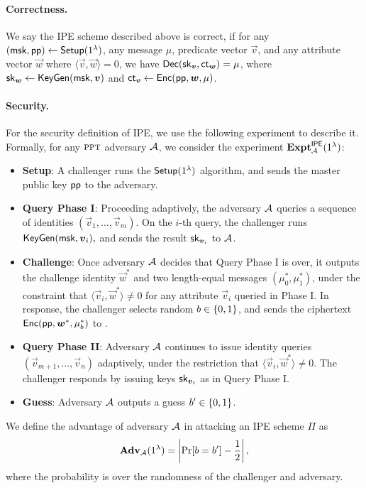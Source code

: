 \paragraph{Correctness.} We say the IPE scheme described above is correct, if for any $(\mathsf{msk}, \mathsf{pp}) \leftarrow \mathsf{Setup}(1^\lambda)$, any message $\mu$, predicate vector $\vec{v}$, and any attribute vector $\vec{w}$ where $\langle \vec{v}, \vec{w}\rangle = 0$, we have $\mathsf{Dec}(\mathsf{sk}_{\boldsymbol{v}}, \mathsf{ct}_{\boldsymbol{w}}) = \mu$, where $\mathsf{sk}_{\boldsymbol{w}} \leftarrow \mathsf{KeyGen}(\mathsf{msk}, \boldsymbol{v})$ and $\mathsf{ct}_{\boldsymbol{v}} \leftarrow \mathsf{Enc}(\mathsf{pp}, \boldsymbol{w}, \mu)$.

\paragraph{Security.}For the security definition of IPE, we use the following experiment to describe it. Formally, for any $\textsc{ppt}$ adversary $\mathcal{A}$, we consider the experiment $\mathbf{Expt}_{\mathcal{A}}^{\mathsf{IPE}}(1^\lambda)$:
\begin{itemize}
 \item \textbf{Setup}: A challenger runs the $\mathsf{Setup}(1^\lambda)$ algorithm, and sends the master public key $\mathsf{pp}$ to the adversary.
 \item \textbf{Query Phase I}: Proceeding adaptively, the adversary $\mathcal{A}$ queries a sequence of identities $(\vec{v}_1,..., \vec{v}_m)$. On the $i$-th query, the challenger runs $\mathsf{KeyGen}(\mathsf{msk}, \boldsymbol{v}_i),$ and sends the result $\mathsf{sk}_{\boldsymbol{v}_i}$ to $\mathcal{A}$.
 \item \textbf{Challenge}: Once adversary $\mathcal{A}$ decides that Query Phase I is over, it outputs the challenge identity $\vec{w}^*$ and two length-equal messages $(\mu^*_0, \mu^*_1)$, under the constraint that $\langle \vec{v}_i, \vec{w}^* \rangle \neq 0$ for any attribute $\vec{v}_i$ queried in Phase I. In response, the challenger selects random $b \in \{0,1\}$, and sends the ciphertext $\mathsf{Enc}(\mathsf{pp}, \boldsymbol{w}^*, \mu^*_b)$ to \A.
 \item \textbf{Query Phase II}: Adversary $\mathcal{A}$ continues to issue identity queries $(\vec{v}_{m + 1},..., \vec{v}_{n})$ adaptively, under the restriction that $\langle \vec{v}_i, \vec{w}^* \rangle \neq 0$. The challenger responds by issuing keys $\mathsf{sk}_{\boldsymbol{v}_i}$ as in Query Phase I.
 \item \textbf{Guess}: Adversary $\mathcal{A}$ outputs a guess $b' \in \{0,1\}$.
\end{itemize}
We define the advantage of adversary $\mathcal{A}$ in attacking an IPE scheme $\Pi$ as 
$$\mathbf{Adv}_{\mathcal{A}}(1^\lambda) = \left|\Pr[b = b'] - \frac{1}{2}\right|,$$
\noindent where the probability is over the randomness of the challenger and adversary.

